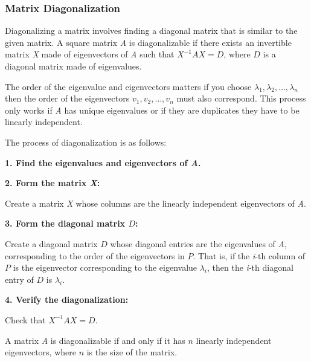 \subsubsection{Matrix Diagonalization}

Diagonalizing a matrix involves finding a diagonal matrix that is similar to the given matrix. 
A square matrix \emph{A} is diagonalizable if there exists an invertible matrix \emph{X} made of eigenvectors of 
\emph{A} such that \(X^{-1}AX = D\), where \(D\) is a diagonal matrix made of eigenvalues.
\vspace{\baselineskip}

The order of the eigenvalue and eigenvectors matters if you choose 
\(\lambda_1, \lambda_2, \dots, \lambda_n\) then the order of the eigenvectors 
\(v_1, v_2, \dots, v_n\) must also correspond. This process only works if \emph{A} 
has unique eigenvalues or if they are duplicates they have to be linearly independent.
\vspace{\baselineskip}

The process of diagonalization is as follows:
\vspace{\baselineskip}

\textbf{1. Find the eigenvalues and eigenvectors of \emph{A}.}
\vspace{\baselineskip}

\textbf{2. Form the matrix \emph{X}:}

Create a matrix \emph{X} whose columns are the linearly independent eigenvectors of \emph{A}.
\vspace{\baselineskip}

\textbf{3. Form the diagonal matrix \(D\):} 

Create a diagonal matrix \(D\) whose diagonal entries are the eigenvalues of \emph{A}, corresponding to 
the order of the eigenvectors in \(P\). That is, if the \emph{i}-th column of \(P\) is the eigenvector 
corresponding to the eigenvalue \(\lambda_i\), then the \emph{i}-th diagonal entry of \(D\) is \(\lambda_i\).
\vspace{\baselineskip}

\textbf{4. Verify the diagonalization:}
    
Check that \(X^{-1}AX = D\).
\vspace{\baselineskip}

A matrix \emph{A} is diagonalizable if and only if it has \(n\) linearly independent eigenvectors, where 
\(n\) is the size of the matrix.
\vspace{\baselineskip}

